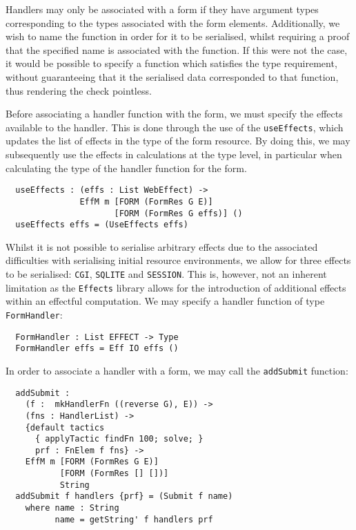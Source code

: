 \documentclass[preprint]{sigplanconf}
\begin{document}
Handlers may only be associated with a form if they have argument types corresponding to the types associated with the form elements. Additionally, we wish to name the function in order for it to be serialised, whilst requiring a proof that the specified name is associated with the function. If this were not the case, it would be possible to specify a function which satisfies the type requirement, without guaranteeing that it the serialised data corresponded to that function, thus rendering the check pointless. 

Before associating a handler function with the form, we must specify the effects available to the handler. This is done through the use of the \texttt{useEffects}, which updates the list of effects in the type of the form resource. By doing this, we may subsequently use the effects in calculations at the type level, in particular when calculating the type of the handler function for the form. 
\begin{Verbatim}
  useEffects : (effs : List WebEffect) ->
               EffM m [FORM (FormRes G E)] 
                      [FORM (FormRes G effs)] ()
  useEffects effs = (UseEffects effs)
\end{Verbatim}
Whilst it is not possible to serialise arbitrary effects due to the associated difficulties with serialising initial resource environments, we allow for three effects to be serialised: \texttt{CGI}, \texttt{SQLITE} and \texttt{SESSION}. This is, however, not an inherent limitation as the \texttt{Effects} library allows for the introduction of additional effects within an effectful computation.
%
We may specify a handler function of type \texttt{FormHandler}:
\begin{Verbatim}
  FormHandler : List EFFECT -> Type
  FormHandler effs = Eff IO effs ()
\end{Verbatim}
In order to associate a handler with a form, we may call the \texttt{addSubmit} function:
\begin{Verbatim}
  addSubmit : 
    (f :  mkHandlerFn ((reverse G), E)) ->
    (fns : HandlerList) ->
    {default tactics 
      { applyTactic findFn 100; solve; }
      prf : FnElem f fns} ->
    EffM m [FORM (FormRes G E)]
           [FORM (FormRes [] [])] 
           String
  addSubmit f handlers {prf} = (Submit f name)
    where name : String
          name = getString' f handlers prf          
\end{Verbatim}
\end{document}
